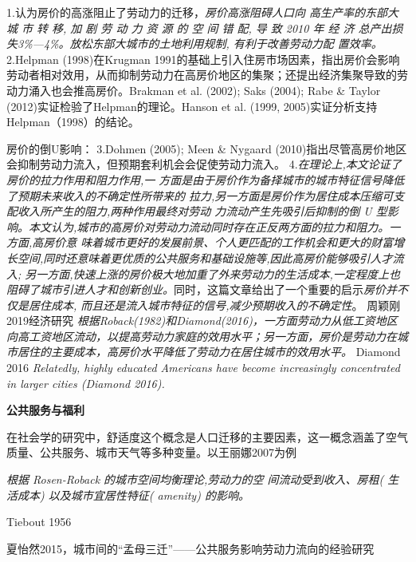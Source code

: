 \documentclass[a4paper,12pt,oneside]{book} %
\begin{document}
1.\cite{WangLiLiTuDiGongGeiFangJieYuLaoDongLiKongJianPeiZhiXiaoLu2023}认为房价的高涨阻止了劳动力的迁移，\textit{房价高涨阻碍人口向 高生产率的东部大 城 市 转 移, 加 剧 劳 动 力 资 源 的 空 间 错 配, 导 致 2010 年 经 济 总产出损失3\%—4\%。放松东部大城市的土地利用规制, 有利于改善劳动力配 置效率。}
2.Helpman (1998)在Krugman 1991的基础上引入住房市场因素，指出房价会影响劳动者相对效用，从而抑制劳动力在高房价地区的集聚；还提出经济集聚导致的劳动力涌入也会推高房价。Brakman et al. (2002); Saks (2004); Rabe \& Taylor (2012)实证检验了Helpman的理论。Hanson et al. (1999, 2005)实证分析支持Helpman（1998）的结论。

房价的倒U影响：
3.Dohmen (2005); Meen \& Nygaard (2010)指出尽管高房价地区会抑制劳动力流入，但预期套利机会会促使劳动力流入。
4.\cite{ZhangLiFangJieRuHeYingXiangLaoDongLiLiuDong2017}\textit{在理论上,本文论证了房价的拉力作用和阻力作用,一 方面是由于房价作为备择城市的城市特征信号降低了预期未来收入的不确定性所带来的 拉力,另一方面是房价作为居住成本压缩可支配收入所产生的阻力,两种作用最终对劳动 力流动产生先吸引后抑制的倒 U 型影响。本文认为,城市的高房价对劳动力流动同时存在正反两方面的拉力和阻力。一方面,高房价意  味着城市更好的发展前景、个人更匹配的工作机会和更大的财富增长空间,同时还意味着更优质的公共服务和基础设施等,因此高房价能够吸引人才流入; 另一方面,快速上涨的房价极大地加重了外来劳动力的生活成本,一定程度上也阻碍了城市引进人才和创新创业。}同时，这篇文章给出了一个重要的启示\textit{房价并不仅是居住成本, 而且还是流入城市特征的信号,减少预期收入的不确定性}。
周颖刚2019经济研究\cite{ZhouYingGangGaoFangJieJiChuLiaoShuiJiYuZhongGuoLiuDongRenKouDeWeiGuanShiJiao2019}
\textit{根据Roback(1982)和Diamond(2016)，一方面劳动力从低工资地区向高工资地区流动，以提高劳动力家庭的效用水平；另一方面，房价是劳动力在城市居住的主要成本，高房价水平降低了劳动力在居住城市的效用水平。}
Diamond 2016\cite{diamondDeterminantsWelfareImplications2016} \textit{Relatedly, highly educated Americans have become increasingly concentrated in larger cities (Diamond 2016).}



\textbf{公共服务与福利}

在社会学的研究中，舒适度这个概念是人口迁移的主要因素，这一概念涵盖了空气质量、公共服务、城市天气等多种变量。以王丽娜2007为例

\textit{根据 Rosen-Roback 的城市空间均衡理论,劳动力的空 间流动受到收入、房租( 生活成本) 以及城市宜居性特征( amenity) 的影响。}

Tiebout 1956

夏怡然2015，城市间的“孟母三迁”——公共服务影响劳动力流向的经验研究
\cite{XiaYiRanChengShiJianDeMengMuSanQianGongGongFuWuYingXiangLaoDongLiLiuXiangDeJingYanYanJiu2015}
\end{document}
